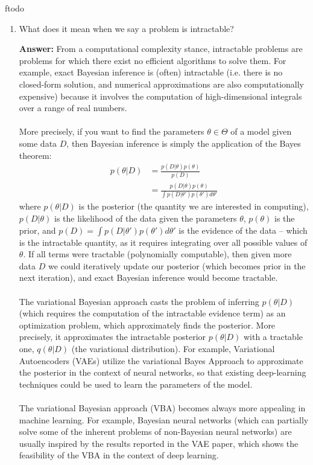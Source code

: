 ƒtodo\documentclass{article}
\newenvironment{QandA}{\begin{enumerate}[label=\arabic*.]}{\end{enumerate}}
\newenvironment{answer}{\par\normalfont \textbf{Answer:}}{}
\newcommand{\g}{\vert}
\begin{document}
\begin{QandA}
    \item What does it mean when we say a problem is intractable?
    \begin{answer}
        From a computational complexity stance, intractable problems are problems for which there exist no efficient algorithms to solve them. For example, exact Bayesian inference is (often) intractable (i.e. there is no closed-form solution, and numerical approximations are also computationally expensive) because it involves the computation of high-dimensional integrals over a range of real numbers.\\\\
        More precisely, if you want to find the parameters $\theta \in \Theta$ of a model given some data $D$, then Bayesian inference is simply the application of the Bayes theorem:
        \begin{align*}
            p(\theta \g D) &= \frac{p(D \g \theta) p(\theta)}{p(D)} \\
            &= \frac{p(D \g \theta) p(\theta)}{\int p(D \g \theta') p(\theta') d \theta'}
        \end{align*}
        where $p(\theta \g D)$ is the posterior (the quantity we are interested in computing), $p(D \g \theta)$ is the likelihood of the data given the parameters $\theta$, $p(\theta)$ is the prior, and $p(D) = \int p(D \g \theta') p(\theta') d \theta'$ is the evidence of the data -- which is the intractable quantity, as it requires integrating over all possible values of $\theta$. If all terms were tractable (polynomially computable), then given more data $D$ we could iteratively update our posterior (which becomes prior in the next iteration), and exact Bayesian inference would become tractable. \\\\
        The variational Bayesian approach casts the problem of inferring $p(\theta \g D)$(which requires the computation of the intractable evidence term) as an optimization problem, which approximately finds the posterior. More precisely, it approximates the intractable posterior $p(\theta \g D)$ with a tractable one, $q(\theta \g D)$ (the variational distribution). For example, Variational Autoencoders (VAEs) utilize the variational Bayes Approach to approximate the posterior in the context of neural networks, so that existing deep-learning techniques could be used to learn the parameters of the model. \\\\
        The variational Bayesian approach (VBA) becomes always more appealing in machine learning. For example, Bayesian neural networks (which can partially solve some of the inherent problems of non-Bayesian neural networks) are usually inspired by the results reported in the VAE paper, which shows the feasibility of the VBA in the context of deep learning.


\end{answer}
\end{QandA}
\end{document}
